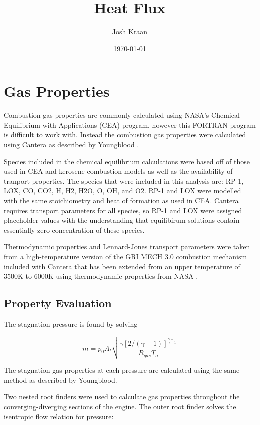 \documentclass[11pt]{article}
\title{Heat Flux}
\author{Josh Kraan}
\date{\today}
\begin{document}
\maketitle

\section{Gas Properties}


Combustion gas properties are commonly calculated using NASA's Chemical Equilibrium with Applications (CEA) \cite{} program, however this FORTRAN program is difficult to work with. Instead the combustion gas properties were calculated using Cantera as described by Youngblood \cite{}.

Species included in the chemical equilibrium calculations were based off of those used in CEA and kerosene combustion models \cite{} as well as the availability of tranport properties. The species that were included in this analysis are: RP-1, LOX, CO, CO2, H, H2, H2O, O, OH, and O2. RP-1 and LOX were modelled with the same stoichiometry and heat of formation as used in CEA. Cantera requires transport parameters for all species, so RP-1 and LOX were assigned placeholder values with the understanding that equilibirum solutions contain essentially zero concentration of these species.

Thermodynamic properties and Lennard-Jones transport parameters were taken from a high-temperature version of the GRI MECH 3.0 combustion mechanism \cite{} included with Cantera that has been extended from an upper temperature of 3500K to 6000K using thermodynamic properties from NASA \cite{}.

\subsection{Property Evaluation}

The stagnation pressure is found by solving

\begin{equation}
  \dot{m} = p_0 A_t \sqrt{\frac{\gamma [2 / (\gamma + 1)]^{\frac{\gamma + 1}{\gamma - 1}}}{R_{gas} T_o}}
\end{equation}

The stagnation gas properties at each pressure are calculated using the same method as described by Youngblood.

Two nested root finders were used to calculate gas properties throughout the converging-diverging sections of the engine. The outer root finder solves the isentropic flow relation for pressure: %
\end{document}
